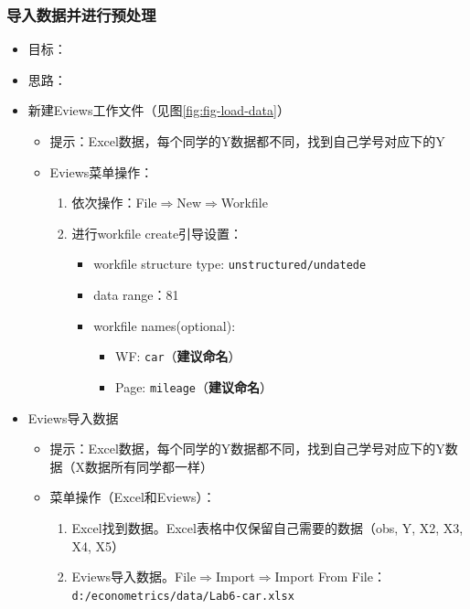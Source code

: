 \documentclass[12pt,(landscape,a4paper),(portrait,a4paper)]{article}
\providecommand{\tightlist}{%
  \setlength{\itemsep}{0pt}\setlength{\parskip}{0pt}}
\begin{document}
\subsubsection{导入数据并进行预处理}

\begin{itemize}
\tightlist
\item
  目标：
\item
  思路：
\item
  新建Eviews工作文件（见图\ref{fig:fig-load-data}）

  \begin{itemize}
  \tightlist
  \item
    提示：Excel数据，每个同学的Y数据都不同，找到自己学号对应下的Y
  \item
    Eviews菜单操作：

    \begin{enumerate}
    \def\labelenumi{\alph{enumi}.}
    \tightlist
    \item
      依次操作：File\(\Rightarrow\)New\(\Rightarrow\)Workfile
    \item
      进行workfile create引导设置：

      \begin{itemize}
      \tightlist
      \item
        workfile structure type: \texttt{unstructured/undatede}
      \item
        data range：81
      \item
        workfile names(optional):

        \begin{itemize}
        \tightlist
        \item
          WF: \texttt{car}（\textbf{建议命名}）
        \item
          Page: \texttt{mileage}（\textbf{建议命名}）
        \end{itemize}
      \end{itemize}
    \end{enumerate}
  \end{itemize}
\item
  Eviews导入数据

  \begin{itemize}
  \tightlist
  \item
    提示：Excel数据，每个同学的Y数据都不同，找到自己学号对应下的Y数据（X数据所有同学都一样）\\
  \item
    菜单操作（Excel和Eviews）：

    \begin{enumerate}
    \def\labelenumi{\alph{enumi}.}
    \tightlist
    \item
      Excel找到数据。Excel表格中仅保留自己需要的数据（obs, Y, X2, X3,
      X4, X5）
    \item
      Eviews导入数据。File\(\Rightarrow\)Import\(\Rightarrow\)Import
      From File：\texttt{d:/econometrics/data/Lab6-car.xlsx}
    \end{enumerate}
  \end{itemize}
\end{itemize}
\end{document}
